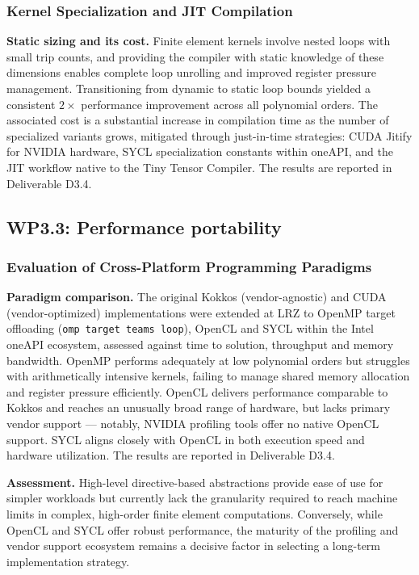 \documentclass[a4paper,12pt, numbers]{article}
\begin{document}
\subsubsection*{Kernel Specialization and JIT Compilation}

\noindent\textbf{Static sizing and its cost.}
Finite element kernels involve nested loops with small trip counts, and providing the compiler with static knowledge of these dimensions enables complete loop unrolling and improved register pressure management. Transitioning from dynamic to static loop bounds yielded a consistent $2\times$ performance improvement across all polynomial orders. The associated cost is a substantial increase in compilation time as the number of specialized variants grows, mitigated through just-in-time strategies: CUDA Jitify for NVIDIA hardware, SYCL specialization constants within oneAPI, and the JIT workflow native to the Tiny Tensor Compiler. The results are reported in Deliverable D3.4.



\subsection{WP3.3: Performance portability}

\subsubsection*{Evaluation of Cross-Platform Programming Paradigms}

\noindent\textbf{Paradigm comparison.}
The original Kokkos (vendor-agnostic) and CUDA (vendor-optimized) implementations were extended at LRZ to OpenMP target offloading (\texttt{omp target teams loop}), OpenCL and SYCL within the Intel oneAPI ecosystem, assessed against time to solution, throughput and memory bandwidth. OpenMP performs adequately at low polynomial orders but struggles with arithmetically intensive kernels, failing to manage shared memory allocation and register pressure efficiently. OpenCL delivers performance comparable to Kokkos and reaches an unusually broad range of hardware, but lacks primary vendor support --- notably, NVIDIA profiling tools offer no native OpenCL support. SYCL aligns closely with OpenCL in both execution speed and hardware utilization. The results are reported in Deliverable D3.4.

\noindent\textbf{Assessment.}
High-level directive-based abstractions provide ease of use for simpler workloads but currently lack the granularity required to reach machine limits in complex, high-order finite element computations. Conversely, while OpenCL and SYCL offer robust performance, the maturity of the profiling and vendor support ecosystem remains a decisive factor in selecting a long-term implementation strategy.
\end{document}
